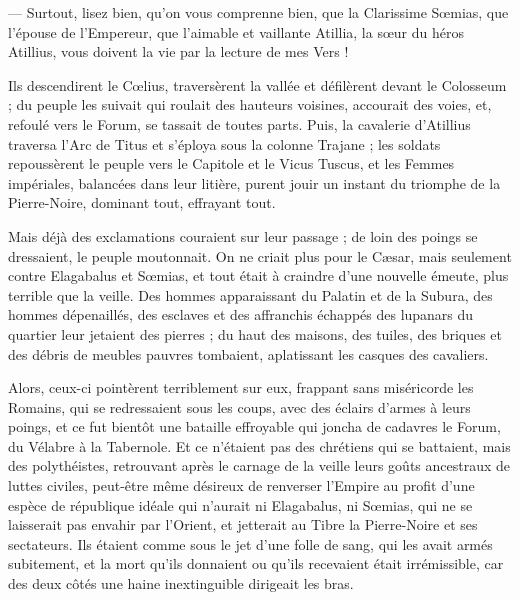 \documentclass[a4paper, 11pt, oneside, polutonikogreek, french]{article}
\begin{document}
--- Surtout, lisez bien, qu'on vous comprenne bien, que la Clarissime Sœmias, que l'épouse de l'Empereur, que l'aimable et vaillante Atillia, la sœur du héros Atillius, vous doivent la vie par la lecture de mes Vers !

Ils descendirent le Cœlius, traversèrent la vallée et défilèrent devant le Colosseum ; du peuple les suivait qui roulait des hauteurs voisines, accourait des voies, et, refoulé vers le Forum, se tassait de toutes parts. Puis, la cavalerie d'Atillius traversa l'Arc de Titus et s'éploya sous la colonne Trajane ; les soldats repoussèrent le peuple vers le Capitole et le Vicus Tuscus, et les Femmes impériales, balancées dans leur litière, purent jouir un instant du triomphe de la Pierre-Noire, dominant tout, effrayant tout.

Mais déjà des exclamations couraient sur leur passage ; de loin des poings se dressaient, le peuple moutonnait. On ne criait plus pour le Cæsar, mais seulement contre Elagabalus et Sœmias, et tout était à craindre d'une nouvelle émeute, plus terrible que la veille. Des hommes apparaissant du Palatin et de la Subura, des hommes dépenaillés, des esclaves et des affranchis échappés des lupanars du quartier leur jetaient des pierres ; du haut des maisons, des tuiles, des briques et des débris de meubles pauvres tombaient, aplatissant les casques des cavaliers.

Alors, ceux-ci pointèrent terriblement sur eux, frappant sans miséricorde les Romains, qui se redressaient sous les coups, avec des éclairs d'armes à leurs poings, et ce fut bientôt une bataille effroyable qui joncha de cadavres le Forum, du Vélabre à la Tabernole. Et ce n'étaient pas des chrétiens qui se battaient, mais des polythéistes, retrouvant après le carnage de la veille leurs goûts ancestraux de luttes civiles, peut-être même désireux de renverser l'Empire au profit d'une espèce de république idéale qui n'aurait ni Elagabalus, ni Sœmias, qui ne se laisserait pas envahir par l'Orient, et jetterait au Tibre la Pierre-Noire et ses sectateurs. Ils étaient comme sous le jet d'une folle de sang, qui les avait armés subitement, et la mort qu'ils donnaient ou qu'ils recevaient était irrémissible, car des deux côtés une haine inextinguible dirigeait les bras.
\end{document}
